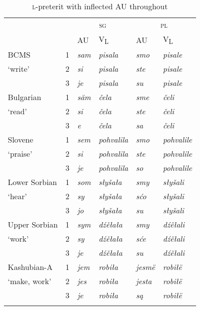 \documentclass[output=paper]{langscibook}
\begin{document}
\begin{table}
\begin{tabular}{llllll}
\lsptoprule
& & \multicolumn{2}{c}{\textsc{sg}} & \multicolumn{2}{c}{\textsc{pl}} \\\cmidrule(lr){3-4}\cmidrule(lr){5-6}
& & AU & V\textsubscript{L} & AU & V\textsubscript{L} \\
\midrule
BCMS & 1 & \textit{sam} & \textit{pisala} & \textit{smo} & \textit{pisale} \\ 
`write'    & 2 & \textit{si} & \textit{pisala} & \textit{ste} & \textit{pisale} \\
    & 3 & \textit{je} & \textit{pisala} & \textit{su} & \textit{pisale} \\\addlinespace
Bulgarian & 1 & \textit{s\u{a}m} & \textit{\v{c}ela} & \textit{sme} & \textit{\v{c}eli} \\ 
`read'            & 2 & \textit{si} & \textit{\v{c}ela} & \textit{ste} & \textit{\v{c}eli} \\ 
            & 3 & \textit{e} & \textit{\v{c}ela} & \textit{sa} & \textit{\v{c}eli} \\\addlinespace
Slovene & 1 & \textit{sem} & \textit{pohvalila} & \textit{smo} & \textit{pohvalile} \\ 
`praise'            & 2 & \textit{si} & \textit{pohvalila} & \textit{ste} & \textit{pohvalile} \\ 
            & 3 & \textit{je} & \textit{pohvalila} & \textit{so} & \textit{pohvalile} \\\addlinespace
Lower Sorbian & 1 & \textit{som} & \textit{słyšała} & \textit{smy} & \textit{słyšali} \\ 
`hear'                & 2 & \textit{sy} & \textit{słyšała} & \textit{sćo} & \textit{słyšali} \\ 
                & 3 & \textit{jo} & \textit{słyšała} & \textit{su} & \textit{słyšali} \\\addlinespace
Upper Sorbian & 1 & \textit{sym} & \textit{dźěłała} & \textit{smy} & \textit{dźěłali} \\ 
`work'            & 2 & \textit{sy} & \textit{dźěłała} & \textit{sće} & \textit{dźěłali} \\
            & 3 & \textit{je} & \textit{dźěłała} & \textit{su} & \textit{dźěłali} \\\addlinespace
Kashubian-A & 1 & \textit{jem} & \textit{robiła} & \textit{jesmë} & \textit{robiłë} \\ 
`make, work'            & 2 & \textit{jes} & \textit{robiła} & \textit{jesta} & \textit{robiłë} \\ 
            & 3 & \textit{je} & \textit{robiła} & \textit{są} & \textit{robiłë} \\ 
\lspbottomrule
\end{tabular}
    \caption{\textsc{l-}preterit with inflected AU throughout}
    \label{pitsch:tab:perfect_full}
\end{table}
\end{document}
